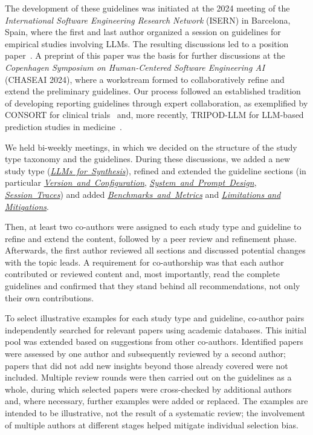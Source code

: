 \documentclass[smallextended]{svjour3}
\newcommand{\synthesis}{\hyperref[sec:llms-for-synthesis]{\mbox{\emph{LLMs for Synthesis}}}\xspace}
\newcommand{\synthesis}{\href{/study-types/synthesis/}{\emph{LLMs for Synthesis}}\xspace}
\newcommand{\modelversion}{\hyperref[sec:report-model-version-configuration-and-customizations]{\mbox{\emph{Version and Configuration}}}\xspace}
\newcommand{\design}{\hyperref[sec:report-system-and-prompt-design]{\mbox{\emph{System and Prompt Design}}}\xspace}
\newcommand{\traces}{\hyperref[sec:report-session-traces]{\mbox{\emph{Session Traces}}}\xspace}
\newcommand{\benchmarksmetrics}{\hyperref[sec:use-suitable-baselines-benchmarks-and-metrics]{\mbox{\emph{Benchmarks and Metrics}}}\xspace}
\newcommand{\limitationsmitigations}{\hyperref[sec:report-limitations-and-mitigations]{\emph{Limitations and Mitigations}}\xspace}
\newcommand{\modelversion}{\href{/guidelines/model-version/}{\emph{Version and Configuration}}\xspace}
\newcommand{\design}{\href{/guidelines/design/}{\emph{System and Prompt Design}}\xspace}
\newcommand{\traces}{\href{/guidelines/traces/}{\emph{Session Traces}}\xspace}
\newcommand{\benchmarksmetrics}{\href{/guidelines/benchmarks-metrics/}{\emph{Benchmarks and Metrics}}\xspace}
\newcommand{\limitationsmitigations}{\href{/guidelines/limitations/}{\emph{Limitations and Mitigations}}\xspace}
\begin{document}
The development of these guidelines was initiated at the 2024 meeting of the \emph{International Software Engineering Research Network} (ISERN) in Barcelona, Spain, where the first and last author organized a session on guidelines for empirical studies involving LLMs. The resulting discussions led to a position paper~\citep{DBLP:conf/wsese/0001BFB25}. A preprint of this paper was the basis for further discussions at the \emph{ Copenhagen Symposium on Human-Centered Software Engineering AI} (CHASEAI 2024), where a workstream formed to collaboratively refine and extend the preliminary guidelines.
Our process followed an established tradition of developing reporting guidelines through expert collaboration, as exemplified by CONSORT for clinical trials~\citep{Begg1996} and, more recently, TRIPOD-LLM for LLM-based prediction studies in medicine~\citep{Gallifant2025}.

We held bi-weekly meetings, in which we decided on the structure of the study type taxonomy and the guidelines.
During these discussions, we added a new study type (\synthesis), refined and extended the guideline sections (in particular \modelversion, \design, \traces) and added \benchmarksmetrics and \limitationsmitigations.

Then, at least two co-authors were assigned to each study type and guideline to refine and extend the content, followed by a peer review and refinement phase.
Afterwards, the first author reviewed all sections and discussed potential changes with the topic leads.
A requirement for co-authorship was that each author contributed or reviewed content and, most importantly, read the complete guidelines and confirmed that they stand behind all recommendations, not only their own contributions.

To select illustrative examples for each study type and guideline, co-author pairs independently searched for relevant papers using academic databases.
This initial pool was extended based on suggestions from other co-authors.
Identified papers were assessed by one author and subsequently reviewed by a second author; papers that did not add new insights beyond those already covered were not included.
Multiple review rounds were then carried out on the guidelines as a whole, during which selected papers were cross-checked by additional authors and, where necessary, further examples were added or replaced.
The examples are intended to be illustrative, not the result of a systematic review; the involvement of multiple authors at different stages helped mitigate individual selection bias.
\end{document}
